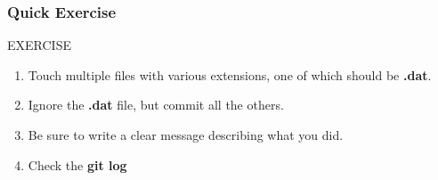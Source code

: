 \documentclass{beamer}
\begin{document}
\begin{frame}[fragile]
\frametitle{Quick Exercise}
    \begin{block}{EXERCISE}
        \begin{enumerate}
        \item Touch multiple files with various extensions, one of which should be \textbf{.dat}.
        \item Ignore the \textbf{.dat} file, but commit all the others.
        \item Be sure to write a clear message describing what you did.
        \item Check the \textbf{git log}
        \end{enumerate}
    \end{block}

\end{frame}
\end{document}
